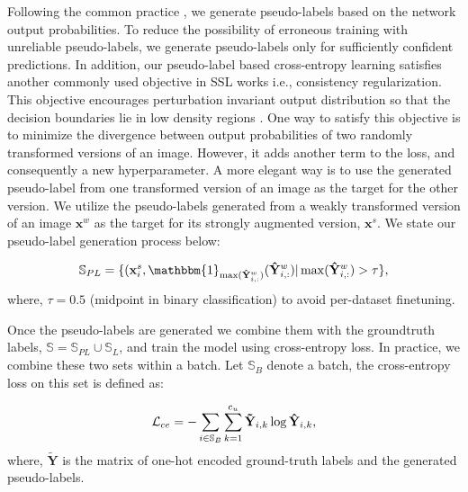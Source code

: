 \documentclass[runningheads]{eccv2022submission}
\begin{document}
Following the common practice \cite{Lee2013PseudoLabelT,arazo2020pseudo,rizve2021in}, we generate pseudo-labels based on the network output probabilities. To reduce the possibility of erroneous training with unreliable pseudo-labels, we generate pseudo-labels only for sufficiently confident predictions. In addition, our pseudo-label based cross-entropy learning satisfies another commonly used objective in SSL works i.e., consistency regularization. This objective encourages perturbation invariant output distribution so that the decision boundaries lie in low density regions \cite{chapelle2005semi,verma2019interpolation}. One way to satisfy this objective is to minimize the divergence between output probabilities of two randomly transformed versions of an image. However, it adds another term to the loss, and consequently a new hyperparameter. A more elegant way is to use the generated pseudo-label from one transformed version of an image as the target for the other version. We utilize the pseudo-labels generated from a weakly transformed version of an image $\mathbf{x}^w$ as the target for its strongly augmented version, $\mathbf{x}^s$. We state our pseudo-label generation process below:


\setlength{\abovedisplayskip}{-4pt}
\setlength{\belowdisplayskip}{4pt}
\setlength{\abovedisplayshortskip}{0pt}
\setlength{\belowdisplayshortskip}{0pt}
\begin{align}
    \mathbb{S}_{PL} =\{(\mathbf{x}_{i}^s, \mathbbm{1}_{\max(\mathbf{\hat{Y}}_{i,:}^w)}(\mathbf{\hat{Y}}_{i,:}^w)|\max(\mathbf{\hat{Y}}_{i,:}^w)>\tau\},
\end{align}
\noindent where, $\tau=0.5$ (midpoint in binary classification) to avoid per-dataset finetuning.

Once the pseudo-labels are generated we combine them with the groundtruth labels, $\mathbb{S}=\mathbb{S}_{PL}\cup\mathbb{S}_{L}$, and train the model using cross-entropy loss. In practice, we combine these two sets within a batch. Let $\mathbb{S}_B$ denote a batch, the cross-entropy loss on this set is defined as:

\setlength{\abovedisplayskip}{-8pt}
\setlength{\belowdisplayskip}{2pt}
\setlength{\abovedisplayshortskip}{0pt}
\setlength{\belowdisplayshortskip}{0pt}
\begin{align}
\label{eqn:ce}
\vspace{-2mm}
   \mathcal{L}_{ce} = -\sum_{i\in\mathbb{S}_B}\sum_{k=1}^{c_u}\mathbf{\tilde{Y}}_{i,k}\log\mathbf{\hat{Y}}_{i,k},
\end{align}
where, $\mathbf{\tilde{Y}}$ is the matrix of one-hot encoded ground-truth labels and the generated pseudo-labels.  
\end{document}
